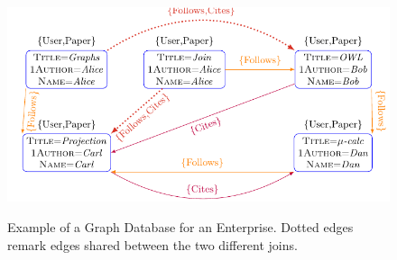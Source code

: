 \begin{figure}[!t]
\begin{adjustbox}{max width=\textwidth}
\begin{minipage}[b]{0.5\textwidth}
			\label{g:conjo}
		\end{minipage}\quad
		\begin{minipage}[b]{0.5\textwidth}
			\centering
			\includegraphics[scale=0.6]{fig/03joins/disj2}
			\label{g:depjo}
		\end{minipage}
	\end{adjustbox}
	\caption{Example of a Graph Database for an Enterprise. Dotted edges remark
		edges  shared between the two different joins.}
	\label{fig:exdb}
\end{figure}
